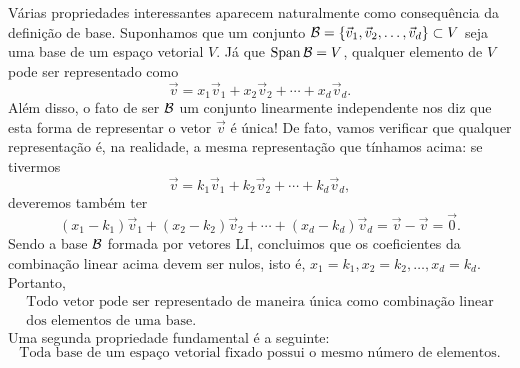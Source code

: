 \documentclass[../livro.tex]{subfiles}  %
\begin{document}
Várias propriedades interessantes aparecem naturalmente como consequência da definição de base. Suponhamos que um conjunto $\mathcal{B} = \{\vec{v}_1, \vec{v}_2, \dots, \vec{v}_d\} \subset V$ seja uma base de um espaço vetorial $V$. Já que $\operatorname{Span} \mathcal{B} = V$, qualquer elemento de $V$ pode ser representado como
\[
\vec{v} = x_1 \vec{v}_1 + x_2 \vec{v}_2 + \cdots + x_d \vec{v}_d.
\] Além disso, o fato de ser $\mathcal{B}$ um conjunto linearmente independente nos diz que esta forma de representar o vetor $\vec{v}$ é única! De fato, vamos verificar que qualquer representação é, na realidade, a mesma representação que tínhamos acima: se tivermos
\[
\vec{v} = k_1 \vec{v}_1 + k_2 \vec{v}_2 + \cdots + k_d \vec{v}_d,
\] deveremos também ter
\[
(x_1-k_1) \vec{v}_1 + (x_2-k_2) \vec{v}_2 + \cdots + (x_d-k_d) \vec{v}_d = \vec{v} - \vec{v} = \vec{0}.
\] Sendo a base $\mathcal{B}$ formada por vetores LI, concluimos que os coeficientes da combinação linear acima devem ser nulos, isto é, $x_1=k_1, x_2=k_2,\dots,x_d=k_d$. Portanto,
\[ 
\boxed{
	\begin{array}{c}
\text{Todo vetor pode ser representado de maneira única como combinação linear} \\ \text{dos elementos de uma base.}
	\end{array}
}
\]
Uma segunda propriedade fundamental é a seguinte:
\[ 
\boxed{
	\text{Toda base de um espaço vetorial fixado possui o mesmo número de elementos.}
}
\]
\end{document}
